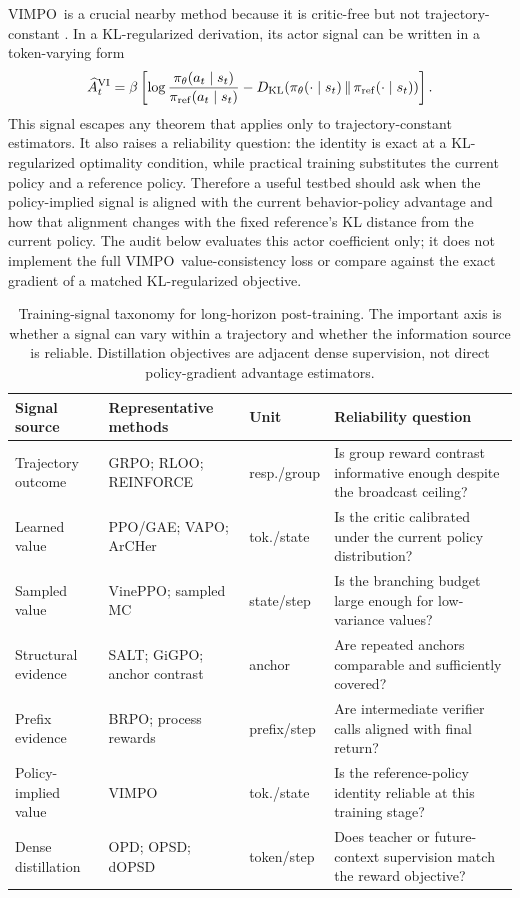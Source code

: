 \documentclass[11pt]{article}
\newcommand{\grpo}{\textsc{GRPO}}
\newcommand{\ppo}{\textsc{PPO}}
\newcommand{\vimpo}{\textsc{VIMPO}}
\newcommand{\brpo}{\textsc{BRPO}}
\newcommand{\KL}{D_{\mathrm{KL}}}
\begin{document}
\vimpo\ is a crucial nearby method because it is critic-free but not
trajectory-constant \citep{kang2026vimpo}. In a KL-regularized derivation, its
actor signal can be written in a token-varying form
\begin{equation}
\widehat A^{\mathrm{VI}}_t =
\beta\left[
  \log\frac{\pi_\theta(a_t\mid s_t)}
           {\pi_{\rm ref}(a_t\mid s_t)}
  -
  \KL\!\left(
    \pi_\theta(\cdot\mid s_t)\,\|\,\pi_{\rm ref}(\cdot\mid s_t)
  \right)
\right].
\end{equation}
This signal escapes any theorem that applies only to trajectory-constant
estimators. It also raises a reliability question: the identity is exact at a
KL-regularized optimality condition, while practical training substitutes the
current policy and a reference policy. Therefore a useful testbed should ask
when the policy-implied signal is aligned with the current behavior-policy
advantage and how that alignment changes with the fixed reference's KL
distance from the current policy. The audit below evaluates this actor
coefficient only; it does not implement the full \vimpo\ value-consistency
loss or compare against the exact gradient of a matched KL-regularized
objective.

\begin{table}[!htbp]
\centering
\caption{Training-signal taxonomy for long-horizon post-training. The important
axis is whether a signal can vary within a trajectory and whether the
information source is reliable. Distillation objectives are adjacent dense
supervision, not direct policy-gradient advantage estimators.}
\label{tab:taxonomy}
\scriptsize
\setlength{\tabcolsep}{4pt}
\renewcommand{\arraystretch}{1.12}
\begin{tabularx}{\linewidth}{@{}L{2.35cm}L{3.15cm}L{1.75cm}Y@{}}
\toprule
Signal source & Representative methods & Unit & Reliability question \\
\midrule
Trajectory outcome & \grpo; RLOO; REINFORCE & resp./group & Is group reward contrast informative enough despite the broadcast ceiling? \\
Learned value & \ppo/GAE; VAPO; ArCHer & tok./state & Is the critic calibrated under the current policy distribution? \\
Sampled value & VinePPO; sampled MC & state/step & Is the branching budget large enough for low-variance values? \\
Structural evidence & SALT; GiGPO; anchor contrast & anchor & Are repeated anchors comparable and sufficiently covered? \\
Prefix evidence & \brpo; process rewards & prefix/step & Are intermediate verifier calls aligned with final return? \\
Policy-implied value & \vimpo & tok./state & Is the reference-policy identity reliable at this training stage? \\
Dense distillation & OPD; OPSD; dOPSD & token/step & Does teacher or future-context supervision match the reward objective? \\
\bottomrule
\end{tabularx}
\end{table}
\end{document}
